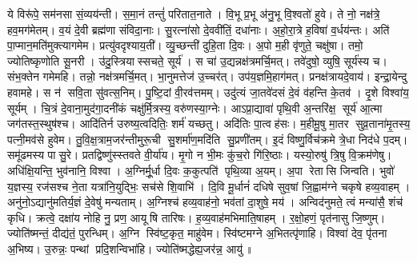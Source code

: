 ये विरू॑पे॒ सम॑नसा सं॒व्यय॑न्ती। स॒मा॒नं तन्तुं॑ परितात॒नाते।
वि॒भू प्र॒भू अ॑नु॒भू वि॒श्वतो॑ हुवे। ते नो॒ नक्ष॑त्रे॒ हव॒मग॑मेतम्।
व॒यं दे॒वी ब्रह्म॑णा संविदा॒नाः। सु॒रत्ना॑सो दे॒ववी॑तिं॒ दधा॑नाः।
अ॒हो॒रा॒त्रे ह॒विषा॑ व॒र्धय॑न्तः। अति॑ पा॒प्मान॒मति॑मुक्त्यागमेम।
प्रत्यु॑वदृश्याय॒ती॑। व्यु॒च्छन्ती॑ दुहि॒ता दि॒वः।
अ॒पो म॒ही वृ॑णुते॒ चक्षु॑षा। तमो॒ ज्योतिष्कृणोति सू॒नरी।
उ॑दु॒स्त्रियास्सचते॒ सूर्य॑। स चा॑ उ॒द्यन्नक्ष॑त्रमर्चि॒मत्।
तवे॑दुषो॒ व्युषि॒ सूर्य॑स्य च। संभ॒क्तेन गमेमहि।
तन्नो॒ नक्ष॑त्रमर्चि॒मत्। भा॒नुमत्तेज॑ उ॒च्चर॑त्।
उप॑य॒ज्ञमि॒हाग॑मत्।
प्रनक्ष॑त्रायदे॒वाय॑। इन्द्रा॒येन्दु हवामहे।
स न॑ सवि॒ता सु॑वत्स॒निम्। पु॒ष्टि॒दां वी॒रव॑त्तमम्।
उदु॑त्यं जा॒तवे॑दसं दे॒वं व॑हन्ति के॒तव॑। दृ॒शे विश्वा॑य॒ सूर्यम्।
चि॒त्रं दे॒वाना॒मुद॑गा॒दनी॑कं चक्षु॑र्मि॒त्रस्य॒ वरु॑णस्या॒ग्नेः।
आऽप्रा॒द्यावा॑ पृथि॒वी अ॒न्तरि॑क्ष॒ सूर्य॑ आ॒त्मा जग॑तस्त॒स्थुष॑श्च।
आदि॑तिर्न उरुष्य॒त्वदितिः॒ शर्म॑ यच्छतु। अदि॑तिः पा॒त्वह॑सः।
म॒हीमू॒षु मा॒तर सुव्र॒ताना॑मृ॒तस्य॒ पत्नी॒मव॑से हुवेम।
तु॒वि॒क्ष॒त्राम॒जर॑न्तीमुरू॒ची सु॒शर्मा॑ण॒मदि॑ति सु॒प्रणी॑तम्।
इ॒दं विष्णु॒र्विच॑क्रमे त्रे॒धा निद॑धे प॒दम्। समू॑ढमस्य पासु॒रे।
प्रतद्विष्णु॑स्स्तवते वी॒र्या॑य। मृ॒गो न भी॒मः कु॑च॒रो गि॑रि॒ष्ठाः।
यस्यो॒रुषु॑ त्रि॒षु वि॒क्रम॑णेषु। अधि॑क्षि॒यन्ति॒ भुव॑नानि॒ विश्वा।
अ॒ग्निर्मू॒र्धा दि॒वः क॒कुत्पति॑ पृथि॒व्या अ॒यम्। अ॒पा रेतासि जिन्वति।
भुवो॑ य॒ज्ञस्य॒ रज॑सश्च ने॒ता यत्रा॑नि॒युद्भिः॒ सच॑से शि॒वाभि॑।
दि॒वि मू॒र्धानं॑ दधिषे सुव॒षां जि॒ह्वाम॑ग्ने चकृषे हव्य॒वाहम्।
अनु॑नो॒ऽद्यानु॑मतिर्य॒ज्ञं दे॒वेषु॑ मन्यताम्।
अ॒ग्निश्च॑ हव्य॒वाह॑नो॒ भव॑तां दा॒शुषे॒ मय॑।
अन्विद॑नुमते॒ त्वं मन्या॑सै॒ शंच॑ कृधि।
क्रत्वे॒ दक्षा॑य नोहि नु॒ प्रण॒ आयूषि तारिषः।
ह॒व्य॒वाह॑मभिमाति॒षाहम्। र॒क्षो॒हणं॒ पृत॑नासु जि॒ष्णुम्।
ज्योति॑ष्मन्तं॒ दीद्य॑तं॒ पुरन्धिम्। अ॒ग्नि स्वि॑ष्ट॒कृत॒ माहु॑वेम।
स्वि॑ष्टमग्ने अ॒भितत्पृ॑णाहि। विश्वा॑ देव॒ पृ॑तना अ॒भिष्य।
उ॒रुन्नः॒ पन्थां प्रदि॒शन्विभा॑हि। ज्योति॑ष्मद्धेह्य॒जर॑न्न॒ आयु॑॥

